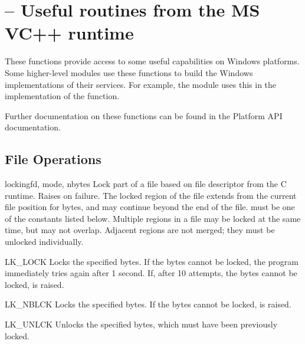 \section{ --
         Useful routines from the MS VC++ runtime}



These functions provide access to some useful capabilities on Windows
platforms.  Some higher-level modules use these functions to build the 
Windows implementations of their services.  For example, the
 module uses this in the implementation of the
 function.

Further documentation on these functions can be found in the Platform
API documentation.


\subsection{File Operations \label{msvcrt-files}}

\begin{funcdesc}{locking}{fd, mode, nbytes}
  Lock part of a file based on file descriptor  from the C
  runtime.  Raises  on failure.  The locked region
  of the file extends from the current file position for 
  bytes, and may continue beyond the end of the file.   must
  be one of the  constants listed below.
  Multiple regions in a file may be locked at the same time, but may
  not overlap.  Adjacent regions are not merged; they must be unlocked
  individually.
\end{funcdesc}

\begin{datadesc}{LK_LOCK}
  Locks the specified bytes. If the bytes cannot be locked, the
  program immediately tries again after 1 second.  If, after 10
  attempts, the bytes cannot be locked,  is
  raised.
\end{datadesc}

\begin{datadesc}{LK_NBLCK}
  Locks the specified bytes. If the bytes cannot be locked,
   is raised.
\end{datadesc}

\begin{datadesc}{LK_UNLCK}
  Unlocks the specified bytes, which must have been previously locked. 
\end{datadesc}


